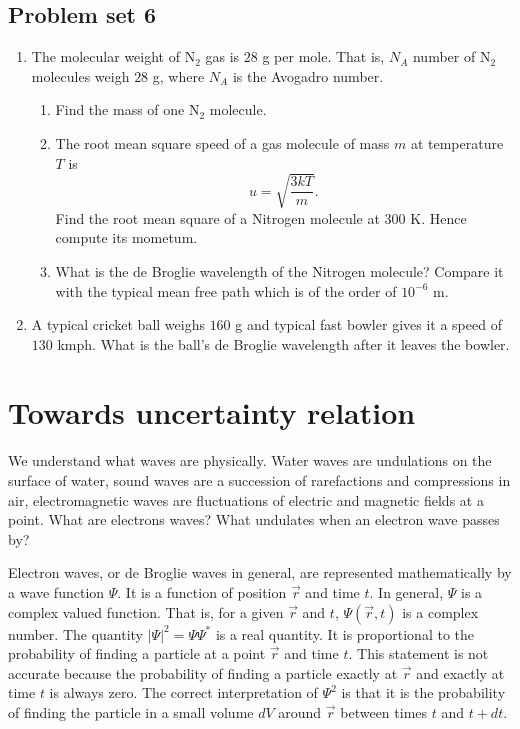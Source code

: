 \subsection{Problem set 6}
\begin{enumerate}
\item The molecular weight of N$_2$ gas is $28$ g per mole. That is, $N_A$ 
number of N$_2$ molecules weigh $28$ g, where $N_A$ is the Avogadro number.
\begin{enumerate}
\item Find the mass of one N$_2$ molecule.
\item The root mean square speed of a gas molecule of mass $m$ at temperature
$T$ is
\begin{equation}
u = \sqrt{\frac{3kT}{m}}.
\end{equation}
Find the root mean square of a Nitrogen molecule at $300$ K. Hence compute its
mometum.
\item What is the de Broglie wavelength of the Nitrogen molecule? Compare it 
with the typical mean free path which is of the order of $10^{-6}$ m.
\end{enumerate}

\item A typical cricket ball weighs $160$ g and typical fast bowler gives it a
speed of $130$ kmph. What is the ball's de Broglie wavelength after it 
leaves the bowler.
\end{enumerate}

\section{Towards uncertainty relation}\label{c2s6}
We understand what waves are physically. Water waves are undulations on the
surface of water, sound waves are a succession of rarefactions and compressions
in air, electromagnetic waves are fluctuations of electric and magnetic fields
at a point. What are electrons waves? What undulates when an electron wave 
passes by?

Electron waves, or de Broglie waves in general, are represented mathematically
by a wave function $\Psi$. It is a function of position $\vec{r}$ and time $t$.
In general, $\Psi$ is a complex valued function. That is, for a given $\vec{r}$
and $t$, $\Psi(\vec{r}, t)$ is a complex number. The quantity $|\Psi|^2 = \Psi
\Psi^\ast$ is a real quantity. It is proportional to the probability of finding
a particle at a point $\vec{r}$ and time $t$. This statement is not accurate
because the probability of finding a particle exactly at $\vec{r}$ and exactly
at time $t$ is always zero. The correct interpretation of $\Psi^2$ is that
it is the probability of finding the particle in a small volume $dV$ around
$\vec{r}$ between times $t$ and $t + dt$. 

